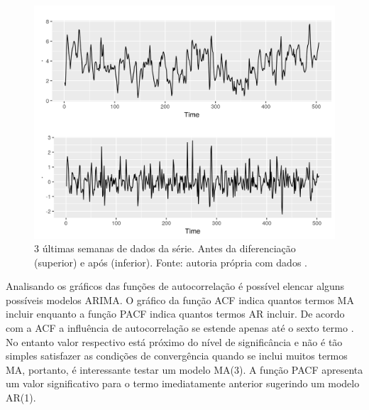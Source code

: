 \documentclass[
	12pt,				%
	openright,			%
	oneside,			%
	a4paper,			%
	english,			%
	french,				%
	spanish,			%
	brazil				%
	]{abntex2}
\begin{document}
\begin{figure}[h]
    \centering
	\includegraphics[width=\textwidth]{last3weeks.png}
	\caption{3 últimas semanas de dados da série. Antes da diferenciação (superior) e após (inferior). Fonte: autoria própria com dados \cite{era5}.}
\end{figure}
\FloatBarrier 

Analisando os gráficos das funções de autocorrelação é possível elencar alguns possíveis modelos ARIMA. O gráfico da função ACF indica quantos termos MA incluir enquanto a função PACF indica quantos termos AR incluir. De acordo com a ACF a influência de autocorrelação se estende apenas até o sexto termo . No entanto valor respectivo está próximo do nível de significância e não é tão simples satisfazer as condições de convergência quando se inclui muitos termos MA, portanto, é interessante testar um modelo MA(3). A função PACF apresenta um valor significativo para o termo imediatamente anterior sugerindo um modelo AR(1). 
\end{document}
